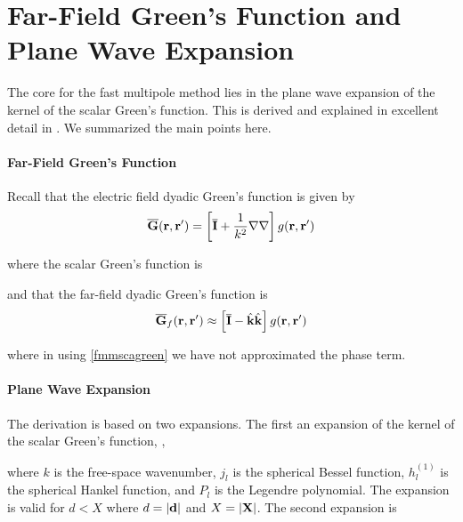 


\section{Far-Field Green's Function and Plane Wave Expansion}

The core for the fast multipole method lies in the plane wave expansion of the kernel of the scalar Green's function.  This is derived and explained in excellent detail in \cite{yucel2008helmholtz}. We summarized the main points here.

\paragraph{Far-Field Green's Function}

Recall that the electric field dyadic Green's function is given by
\begin{equation}
 \overline{\mathbf{G}}(\mathbf{r},\mathbf{r}') = \left[\overline{\mathbf{I}} + \dfrac{1}{k^2} \nabla\nabla \right] g(\mathbf{r},\mathbf{r}') 
 \end{equation}
 
\noindent where the scalar Green's function is 

\noindent and that the far-field dyadic Green's function is
\begin{equation}
 \overline{\mathbf{G}}_f(\mathbf{r},\mathbf{r}') \approx \left[\overline{\mathbf{I}} - \hat{\mathbf{k}} \hat{\mathbf{k}} \right] g(\mathbf{r},\mathbf{r}') 
 \end{equation}
 
 \noindent where in using \eqref{fmmscagreen} we have not approximated the phase term. 


\paragraph{Plane Wave Expansion}

The derivation is based on two expansions. The first an expansion of the kernel of the scalar Green's function, \cite{yucel2008helmholtz}, 

\noindent where $k$ is the free-space wavenumber, $j_l$ is the spherical Bessel function, $h_l^{(1)}$ is the spherical Hankel function, and $P_l$ is the Legendre polynomial. The expansion is valid for $d < X$ where $d = \vert \mathbf{d} \vert$ and $X = \vert \mathbf{X} \vert$. The second expansion is 

